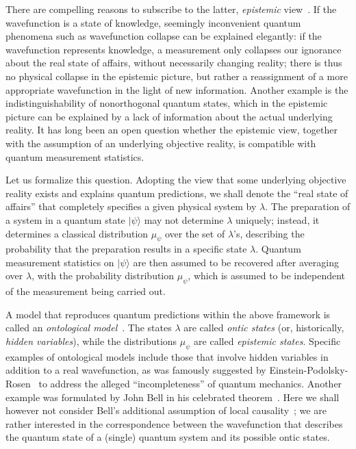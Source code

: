 \documentclass[aps,prl,floatfix,onecolumn,tightenlines,amsmath,amssymb,nofootinbib,12pt]{revtex4-2}
\newcommand{\ket}[1] {| #1 \rangle}
\begin{document}
There are compelling reasons to subscribe to the latter, \emph{epistemic} view~\cite{Spekkens2007}.
If the wavefunction is a state of knowledge, seemingly inconvenient quantum phenomena such as wavefunction collapse can be explained elegantly: if the wavefunction represents knowledge, a measurement only collapses our ignorance about the real state of affairs, without necessarily changing reality; there is thus no physical collapse in the epistemic picture, but rather a reassignment of a more appropriate wavefunction in the light of new information. Another example is the indistinguishability of nonorthogonal quantum states, which in the epistemic picture can be explained by a lack of information about the actual underlying reality. It has long been an open question whether the epistemic view, together with the assumption of an underlying objective reality, is compatible with quantum measurement statistics.

Let us formalize this question. Adopting the view that some underlying objective reality exists and explains quantum predictions, we shall denote the ``real state of affairs'' that completely specifies a given physical system by $\lambda$. 
The preparation of a system in a quantum state $\ket{\psi}$ may not determine $\lambda$ uniquely; instead, it determines a classical distribution $\mu_\psi$ over the set of $\lambda$'s, describing the probability that the preparation results in a specific state $\lambda$. Quantum measurement statistics on $\ket{\psi}$ are then assumed to be recovered after averaging over $\lambda$, with the probability distribution $\mu_\psi$, which is assumed to be independent of the measurement being carried out.

A model that reproduces quantum predictions within the above framework is called an \emph{ontological model}~\cite{Harrigan2010}. The states $\lambda$ are called \emph{ontic states} (or, historically, \emph{hidden variables}), while the distributions $\mu_\psi$ are called \emph{epistemic states}. Specific examples of ontological models include those that involve hidden variables in addition to a real wavefunction, as was famously suggested by Einstein-Podolsky-Rosen~\cite{einstein1935cqm} to address the alleged ``incompleteness'' of quantum mechanics. Another example was formulated by John Bell in his celebrated theorem~\cite{Bell1964}. Here we shall however not consider Bell's additional assumption of local causality~\cite{RevModPhys.86.419}; we are rather interested in the correspondence between the wavefunction that describes the quantum state of a (single) quantum system and its possible ontic states.
\end{document}
